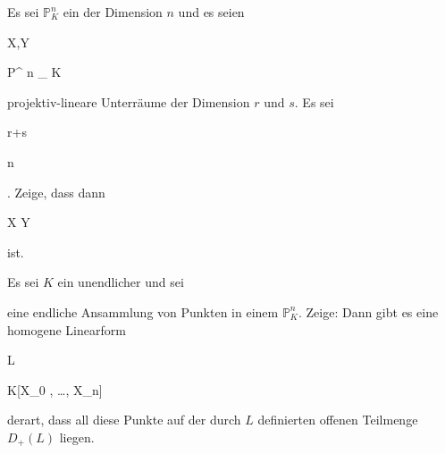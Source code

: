 
{}

{


Es sei ${\mathbb P}^{ n }_{ K }$ ein
der Dimension $n$ und es seien


\mavergleichskette

{\vergleichskette

{ X,Y
}

{ \subseteq }{ {\mathbb P}^{ n }_{ K }
}

{  }{
}

{    }{
}

{   }{
}

}
{}{}{}
projektiv-lineare Unterräume der Dimension $r$ und $s$. Es sei


\mavergleichskette

{\vergleichskette

{ r+s
}

{ \geq }{ n
}

{  }{
}

{    }{
}

{   }{
}

}
{}{}{.}
Zeige, dass dann


\mavergleichskette

{\vergleichskette

{ X \cap Y
}

{ \neq }{ \emptyset
}

{  }{
}

{    }{
}

{   }{
}

}
{}{}{}
ist.


}

{} {}



{}

{


Es sei $K$ ein unendlicher
und sei

 eine endliche Ansammlung von Punkten in einem
${\mathbb P}^{ n }_{ K }$. Zeige: Dann gibt es eine homogene Linearform


\mavergleichskette

{\vergleichskette

{ L
}

{ \in }{ K[X_0 , \ldots , X_n]
}

{  }{
}

{    }{
}

{   }{
}

}
{}{}{}
derart, dass all diese Punkte auf der durch $L$ definierten offenen Teilmenge $D_+(L)$ liegen.


}


